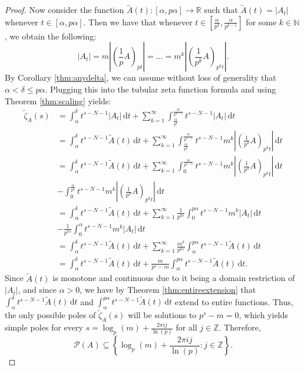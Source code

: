 \documentclass{article}
\theoremstyle{plain}
\numberwithin{equation}{section}
\numberwithin{table}{section}
\numberwithin{figure}{section}
\begin{document}
\begin{proof}
Now consider the function $\tilde{A}(t) : [\alpha, p\alpha] \rightarrow \mathbb{R}$ such that $\tilde{A}(t) = |A_t|$ whenever $t \in [\alpha,p\alpha]$. Then we have that whenever $t \in \left[\frac{\alpha}{p^k}, \frac{\alpha}{p^{k-1}}\right]$ for some $k \in \mathbb{N}$, we obtain the following:
\begin{equation}
|A_t| = m \left|\left(\frac{1}{p} A\right)_{p t}\right| =\dots= m^k \left|\left(\frac{1}{p^k} A\right)_{p^k t}\right|.
\end{equation}
By Corollary \ref{thm:anydelta}, we can assume without loss of generality that $\alpha < \delta \leq p\alpha$. Plugging this into the tubular zeta function formula and using Theorem \ref{thm:scaling} yields:
\begin{align}
\tilde{\zeta}_A(s)
&= \int_{\alpha}^{\delta} t^{s-N-1} |A_t| \,\mathrm{d}t + \sum_{k=1}^{\infty} \int_{\frac{\alpha}{p^k}}^{\frac{\alpha}{p^{k-1}}} t^{s-N-1} |A_t| \,\mathrm{d}t \\
&= \int_{\alpha}^{\delta} t^{s-N-1} \tilde{A}(t) \,\mathrm{d}t + \sum_{k=1}^{\infty} \int_{\frac{\alpha}{p^k}}^{\frac{\alpha}{p^{k-1}}} t^{s-N-1} m^k \left|\left(\frac{1}{p^k} A\right)_{p^k t}\right| \,\mathrm{d}t\\
&= \int_{\alpha}^{\delta} t^{s-N-1} \tilde{A}(t) \,\mathrm{d}t + \sum_{k=1}^{\infty} \int_0^{\frac{\alpha}{p^{k-1}}} t^{s-N-1} m^k \left|\left(\frac{1}{p^k} A\right)_{p^k t}\right| \,\mathrm{d}t \nonumber\\&- \int_0^{\frac{\alpha}{p^k}} t^{s-N-1} m^k \left|\left(\frac{1}{p^k} A\right)_{p^k t}\right| \,\mathrm{d}t \\
&= \int_{\alpha}^{\delta} t^{s-N-1} \tilde{A}(t) \,\mathrm{d}t + \sum_{k=1}^{\infty} \frac{1}{p^{k s}} \int_0^{p\alpha} t^{s-N-1} m^k \left|A_t\right| \,\mathrm{d}t \nonumber\\&- \frac{1}{p^{k s}} \int_0^{\alpha} t^{s-N-1} m^k \left|A_t\right| \,\mathrm{d}t\\
&= \int_{\alpha}^{\delta} t^{s-N-1} \tilde{A}(t) \,\mathrm{d}t + \sum_{k=1}^{\infty} \frac{m^k}{p^{k s}} \int_{\alpha}^{p\alpha} t^{s-N-1} \tilde{A}(t) \,\mathrm{d}t \\
&= \int_{\alpha}^{\delta} t^{s-N-1} \tilde{A}(t) \,\mathrm{d}t + \frac{m}{p^s - m} \int_{\alpha}^{p\alpha} t^{s-N-1} \tilde{A}(t) \,\mathrm{d}t.
\end{align}
Since $\tilde{A}(t)$ is monotone and continuous due to it being a domain restriction of $|A_t|$, and since $\alpha > 0$, we have by Theorem \ref{thm:entireextension} that $\displaystyle \int_{\alpha}^{\delta} t^{s-N-1} \tilde{A}(t) \,\mathrm{d}t$ and $\displaystyle \int_{\alpha}^{p\alpha} t^{s-N-1} \tilde{A}(t) \,\mathrm{d}t$ extend to entire functions. Thus, the only possible poles of $\tilde{\zeta}_A(s)$ will be solutions to $p^s - m = 0$, which yields simple poles for every $s = \log_p(m) + \frac{2\pi i j}{\ln(p)}$ for all $j \in \mathbb{Z}$. Therefore,
\begin{equation}
\mathscr{P}(A) \subseteq \left\{\log_p(m) + \frac{2\pi i j}{\ln(p)}: j \in \mathbb{Z}\right\}.
\end{equation}
\end{proof}
\end{document}
